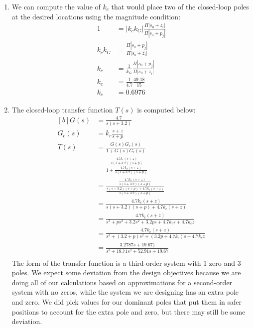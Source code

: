 \documentclass[12pt]{article}
\begin{document}
\begin{enumerate}
    \item %
    We can compute the value of $k_c$ that would place two of the closed-loop poles at the desired locations using the magnitude condition:
    \begin{equation*}
    \begin{aligned}
        1 &= |k_c k_G| \frac{\Pi |s_0 + z_i|}{\Pi |s_0 + p_j|} \\
        k_c k_G &= \frac{\Pi |s_0 + p_j|}{\Pi |s_0 + z_i|} \\
        k_c &= \frac{1}{k_G} \frac{\Pi |s_0 + p_j|}{\Pi |s_0 + z_i|} \\
        k_c &= \frac{1}{4.7} \frac{49.18}{15} \\
        k_c &= 0.6976
    \end{aligned}
    \end{equation*}

    \item %
    The closed-loop transfer function $T(s)$ is computed below:
    \begin{equation*}
    \begin{aligned}[b]
        G(s) &= \frac{4.7}{s(s + 3.2)} \\
        G_c(s) &= k_c\frac{s + z}{s + p} \\
        T(s) &= \frac{G(s)G_c(s)}{1 + G(s)G_c(s)} \\
        &= \frac{\frac{4.7 k_c (s + z)}{s(s + 3.2)(s + p)}}{1 + \frac{4.7 k_c (s + z)}{s(s + 3.2)(s + p)}} \\
        &= \frac{\frac{4.7 k_c (s + z)}{s(s + 3.2)(s + p)}}{\frac{s(s + 3.2)(s + p) + 4.7 k_c (s + z)}{s(s + 3.2)(s + p)}} \\
        &= \frac{4.7 k_c (s + z)}{s(s + 3.2)(s + p) + 4.7 k_c (s + z)} \\
        &= \frac{4.7 k_c (s + z)}{s^3 + ps^2 + 3.2s^2 + 3.2 p s + 4.7 k_c s + 4.7 k_c z} \\
        &= \frac{4.7 k_c (s + z)}{s^3 + (3.2 + p)s^2 + (3.2 p + 4.7 k_c)s + 4.7 k_c z} \\
        &= \frac{3.2787 s + 19.67)}{s^3 + 18.71s^2 + 52.91s + 19.67} \\
    \end{aligned}
    \end{equation*}
    The form of the transfer function is a third-order system with 1 zero and 3 poles. We expect some deviation from the design objectives because we are doing all of our calculations based on approximations for a second-order system with no zeros, while the system we are designing has an extra pole and zero. We did pick values for our dominant poles that put them in safer positions to account for the extra pole and zero, but there may still be some deviation.


\end{enumerate}
\end{document}
